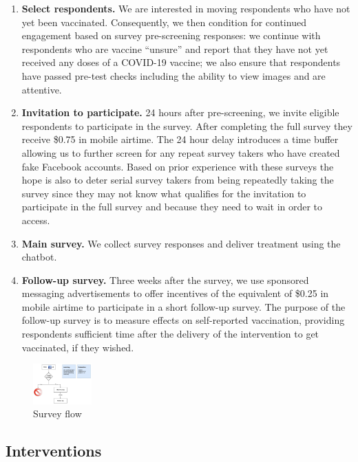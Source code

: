 \documentclass[letterpaper, 12pt, parskip=full,DIV=10]{scrartcl}
\begin{document}
\begin{enumerate}
\item \textbf{Select respondents.} We are interested in moving respondents who have not yet been vaccinated. Consequently, we then condition for continued engagement based on survey pre-screening responses: we continue with respondents who are vaccine “unsure” and report that they have not yet received any doses of a COVID-19 vaccine; we also ensure that respondents have passed pre-test checks including the ability to view images and are attentive. 

\item \textbf{Invitation to participate.} 24 hours after pre-screening, we invite eligible respondents to participate in the survey. After completing the full survey they receive \$0.75 in mobile airtime. The 24 hour delay introduces a time buffer allowing us to further screen for any repeat survey takers who have created fake Facebook accounts. Based on prior experience with these surveys the hope is also to deter serial survey takers from being repeatedly taking the survey since they may not know what qualifies for the invitation to participate in the full survey and because they need to wait in order to access. 

\item \textbf{Main survey.} We collect survey responses and deliver treatment using the chatbot. 

\item \textbf{Follow-up survey.} Three weeks after the survey, we use sponsored messaging advertisements to offer incentives of the equivalent of \$0.25 in mobile airtime to participate in a short follow-up survey. The purpose of the follow-up survey is to measure effects on self-reported vaccination, providing respondents sufficient time after the delivery of the intervention to get vaccinated, if they wished.

\end{enumerate}

\begin{figure}[h!]
   \centering
   \includegraphics[width = 0.2\textwidth]{../../tables-figures/vcf_survey_flow.jpg} 
   \caption{Survey flow}
   \label{fig:surveyflow}
\end{figure}


\subsection{Interventions}
\end{document}
